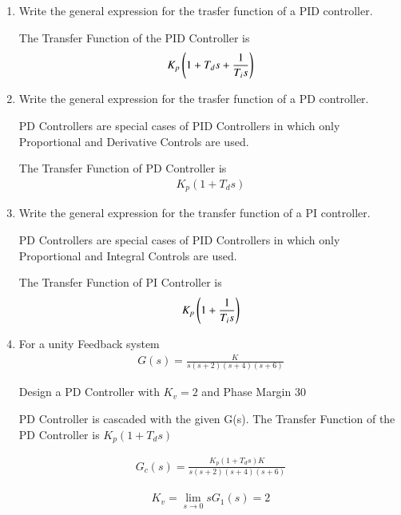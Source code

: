 \begin{enumerate}[label=\thesection.\arabic*.,ref=\thesection.\theenumi]

\item
Write the general expression for the trasfer function of a PID controller.

\solution
The Transfer Function of the PID Controller is
\begin{align}
    K_{p}\left(1 + T_{d}s + \frac{1}{T_{i}s}\right)
\end{align}

\item
Write the general expression for the trasfer function of a PD controller.

\solution
PD Controllers are special cases of PID Controllers in which only Proportional and Derivative Controls are used.

The Transfer Function of PD Controller is 
\begin{align}
    K_{p}(1 + T_{d}s)
\end{align}

\item
Write the general expression for the transfer function of a PI controller.

\solution
PD Controllers are special cases of PID Controllers in which only Proportional and Integral Controls are used.

The Transfer Function of PI Controller is 
\begin{align}
    K_{p}\left(1 +  \frac{1}{T_{i}s}\right)
\end{align}


\item
For a unity Feedback system 
\begin{align}
    G(s) = \frac{K}{s(s+2)(s+4)(s+6)}
\end{align}


Design a PD Controller with $K_{v} = 2$ and Phase Margin 30\degree

\solution
PD Controller is cascaded with the given G(s).
The Transfer Function of the PD Controller is $K_{p}(1 + T_{d}s)$

\begin{align}
    G_{c}(s) = \frac{K_{p}(1 + T_{d}s)K}{s(s+2)(s+4)(s+6)}
\end{align}

\begin{align}
    K_{v} = \lim_{s \to 0} sG_{1}(s) = 2
\end{align}


\end{enumerate}
